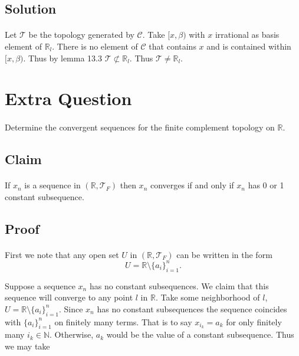 \documentclass[11pt, oneside]{article}   	%
\newcommand{\R}{\mathbb{R}}
\newcommand{\bb}[1]{\mathbb{#1}}
\newcommand{\scr}[1]{\mathscr{#1}}
\begin{document}
 \subsection*{Solution}
 \paragraph{}
 
 Let $\scr{T}$ be the topology generated by $\scr{C}$. Take $[x,\beta)$ with $x$ irrational as basis element of $\R_l$. There is no element of $\scr{C}$ that contains $x$ and is contained within $[x,\beta)$. Thus by lemma 13.3 $\scr{T} \not \subset \R_l$. Thus $\scr{T}  \neq \R_l$.
 
 
 \section*{Extra Question}
 \paragraph{}
 
 Determine the convergent sequences for the finite complement topology on $\R$.
 
 \subsection*{Claim}
 \paragraph{}
 
 If ${x_n}$ is a sequence in $(\R, \scr{T}_F)$ then $x_n$ converges if and only if $x_n$ has 0 or 1 constant subsequence.
 
 \subsection*{Proof}
 \paragraph{}
 First we note that any open set $U$ in $(\R, \scr{T}_F)$ can be written in the form 
 \[
U = \R \setminus \{a_i\}_{i=1}^n.
 \]
 
Suppose a sequence $x_n$ has no constant subsequences. We claim that this sequence will converge to any point $l$ in $\R$. Take some neighborhood of $l$, $U = \R \setminus \{a_i\}_{i=1}^n$. Since $x_n$ has no constant subsequences the sequence coincides with $\{a_i\}_{i=1}^n$ on finitely many terms. That is to say $x_{i_k} = a_k$ for only finitely many $i_k \in \bb{N}$. Otherwise, $a_k$ would be the value of a constant subsequence. Thus we may take 
\end{document}
